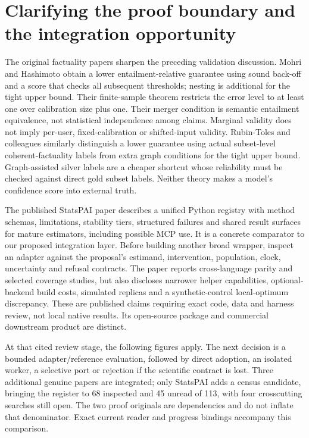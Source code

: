 \hypertarget{clarifying-the-proof-boundary-and-the-integration-opportunity}{%
\section{Clarifying the proof boundary and the integration
opportunity}\label{clarifying-the-proof-boundary-and-the-integration-opportunity}}

The original factuality papers sharpen the preceding validation
discussion. Mohri and Hashimoto obtain a lower entailment-relative
guarantee using sound back-off and a score that checks all subsequent
thresholds; nesting is additional for the tight upper bound. Their
finite-sample theorem restricts the error level to at least one over
calibration size plus one. Their merger condition is semantic entailment
equivalence, not statistical independence among claims. Marginal
validity does not imply per-user, fixed-calibration or shifted-input
validity. Rubin-Toles and colleagues similarly distinguish a lower
guarantee using actual subset-level coherent-factuality labels from
extra graph conditions for the tight upper bound. Graph-assisted silver
labels are a cheaper shortcut whose reliability must be checked against
direct gold subset labels. Neither theory makes a model's confidence
score into external truth.
\citep{exec23_mohri_factuality,exec23_coherent_factuality}

The published StatsPAI paper describes a unified Python registry with
method schemas, limitations, stability tiers, structured failures and
shared result surfaces for mature estimators, including possible MCP
use. It is a concrete comparator to our proposed integration layer.
Before building another broad wrapper, inspect an adapter against the
proposal's estimand, intervention, population, clock, uncertainty and
refusal contracts. The paper reports cross-language parity and selected
coverage studies, but also discloses narrower helper capabilities,
optional-backend build costs, simulated replicas and a synthetic-control
local-optimum discrepancy. These are published claims requiring exact
code, data and harness review, not local native results. Its open-source
package and commercial downstream product are distinct.
\citep{exec23_statspai_paper}

At that cited review stage, the following figures apply. The next
decision is a bounded adapter/reference evaluation, followed by direct
adoption, an isolated worker, a selective port or rejection if the
scientific contract is lost. Three additional genuine papers are
integrated; only StatsPAI adds a census candidate, bringing the register
to 68 inspected and 45 unread of 113, with four crosscutting searches
still open. The two proof originals are dependencies and do not inflate
that denominator. Exact current reader and progress bindings accompany
this comparison. \citep{sp23proof_reader,sp23proof_progress}

